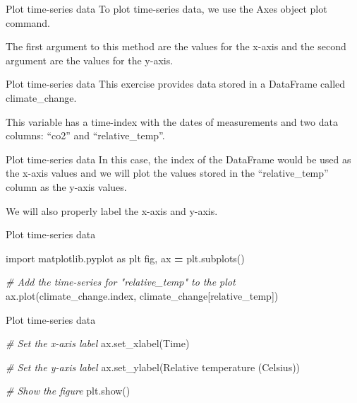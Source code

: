 \documentclass[
  ignorenonframetext,
]{beamer}
\newenvironment{Shaded}{\begin{snugshade}}{\end{snugshade}}
\newcommand{\CommentTok}[1]{\textcolor[rgb]{0.56,0.35,0.01}{\textit{#1}}}
\newcommand{\ImportTok}[1]{#1}
\newcommand{\NormalTok}[1]{#1}
\newcommand{\OperatorTok}[1]{\textcolor[rgb]{0.81,0.36,0.00}{\textbf{#1}}}
\newcommand{\StringTok}[1]{\textcolor[rgb]{0.31,0.60,0.02}{#1}}
\begin{document}
\begin{frame}{Plot time-series data}
\label{plot-time-series-data}
To plot time-series data, we use the Axes object plot command.

The first argument to this method are the values for the x-axis and the
second argument are the values for the y-axis.
\end{frame}

\begin{frame}{Plot time-series data}
\label{plot-time-series-data-1}
This exercise provides data stored in a DataFrame called
climate\_change.

This variable has a time-index with the dates of measurements and two
data columns: ``co2'' and ``relative\_temp''.
\end{frame}

\begin{frame}{Plot time-series data}
\label{plot-time-series-data-2}
In this case, the index of the DataFrame would be used as the x-axis
values and we will plot the values stored in the ``relative\_temp''
column as the y-axis values.

We will also properly label the x-axis and y-axis.
\end{frame}

\begin{frame}[fragile]{Plot time-series data}
\label{plot-time-series-data-3}

\begin{Shaded}
\begin{Highlighting}[]
\ImportTok{import}\NormalTok{ matplotlib.pyplot }\ImportTok{as}\NormalTok{ plt}
\NormalTok{fig, ax }\OperatorTok{=}\NormalTok{ plt.subplots()}

\CommentTok{\# Add the time{-}series for "relative\_temp" to the plot}
\NormalTok{ax.plot(climate\_change.index, climate\_change[}\StringTok{\textquotesingle{}relative\_temp\textquotesingle{}}\NormalTok{])}
\end{Highlighting}
\end{Shaded}
\end{frame}

\begin{frame}[fragile]{Plot time-series data}
\label{plot-time-series-data-4}

\begin{Shaded}
\begin{Highlighting}[]
\CommentTok{\# Set the x{-}axis label}
\NormalTok{ax.set\_xlabel(}\StringTok{\textquotesingle{}Time\textquotesingle{}}\NormalTok{)}

\CommentTok{\# Set the y{-}axis label }
\NormalTok{ax.set\_ylabel(}\StringTok{\textquotesingle{}Relative temperature (Celsius)\textquotesingle{}}\NormalTok{)}

\CommentTok{\# Show the figure}
\NormalTok{plt.show()}
\end{Highlighting}
\end{Shaded}
\end{frame}
\end{document}
